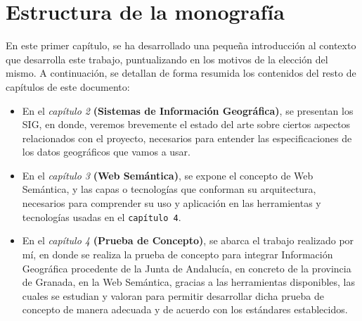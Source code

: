 \section{Estructura de la monografía}


En este primer capítulo, se ha desarrollado una pequeña introducción al contexto que desarrolla este trabajo, puntualizando en los motivos de la elección del mismo. A continuación, se detallan de forma resumida los contenidos del resto de capítulos de este documento:

\begin{itemize}
	\item En el \textit{capítulo 2} \textbf{(Sistemas de Información Geográfica)}, se presentan los SIG, en donde, veremos brevemente el estado del arte sobre ciertos aspectos relacionados con el proyecto, necesarios para entender las especificaciones de los datos geográficos que vamos a usar.
	
	\item En el \textit{capítulo 3} \textbf{(Web Semántica)}, se expone el concepto de Web Semántica, y las capas o tecnologías que conforman su arquitectura, necesarios para comprender su uso y aplicación en las herramientas y tecnologías usadas en el \texttt{capítulo 4}.
	
	\item En el \textit{capítulo 4} \textbf{(Prueba de Concepto)}, se abarca el trabajo realizado por mí, en donde se realiza la prueba de concepto para integrar Información Geográfica procedente de la Junta de Andalucía, en concreto de la provincia de Granada, en la Web Semántica, gracias a las herramientas disponibles, las cuales se estudian y valoran para permitir desarrollar dicha prueba de concepto de manera adecuada y de acuerdo con los estándares establecidos.
	
	

\end{itemize}
